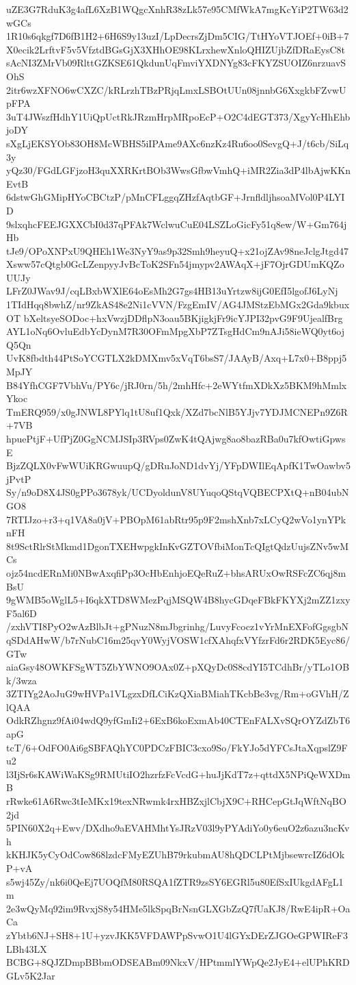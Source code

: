 uZE3G7RduK3g4afL6XzB1WQgcXnhR38zLk57e95CMfWkA7mgKcYiP2TW63d2wGCs
1R10s6qkgf7D6fB1H2+6H6S9y13uzI/LpDecrsZjDm5CIG/TtHYoVTJOEf+0iB+7
X0ecik2LrftvF5v5VfztdBGsGjX3XHhOE98KLrxhewXnloQHIZUjbZfDRaEysC8t
sAcNI3ZMrVb09RlttGZKSE61QkdunUqFmviYXDNYg83cFKYZSUOIZ6nrzuavSOhS
2itr6wzXFNO6wCXZC/kRLrzhTBzPRjqLmxLSBOtUUn08jnnbG6XxgkbFZvwUpFPA
3uT4JWszfHdhY1UiQpUctRkJRzmHrpMRpoEcP+O2C4dEGT373/XgyYcHhEhbjoDY
sXgLjEKSYOb83OH8McWBHS5iIPAme9AXc6nzKz4Ru6oo0SevgQ+J/t6cb/SiLq3y
yQz30/FGdLGFjzoH3quXXRKrtBOb3WwsGfbwVmhQ+iMR2Zia3dP4lbAjwKKnEvtB
6dstwGhGMipHYoCBCtzP/pMnCFLggqZHzfAqtbGF+JrnfldljhsoaMVol0P4LYID
9slxqhcFEEJGXXCbI0d37qPFAk7WclwuCuE04LSZLoGicFy51q8ew/W+Gm764jHb
tJe9/OPoXNPxU9QHEh1We3NyY9as9p32Smh9heyuQ+x21ojZAv98neJclgJtgd47
Xsww57cQtgb0GcLZenpyyJvBcToK2SFn54jmypv2AWAqX+jF7OjrGDUmKQZoUUJy
LFrZ0JWav9J/cqLBxbWXlE64oEsMh2G7gs4HB13uYrtzw8ijG0EfI5lgofJ6LyNj
1TIdHqq8bwhZ/nr9ZkAS48e2Ni1cVVN/FzgEmIV/AG4JMStzEbMGx2Gda9kbuxOT
bXeltsyeSODoc+hxVwzjDDflpN3oau5BKjigkjFr9icYJPI32pvG9F9UjealfBrg
AYL1oNq6OvluEdbYcDynM7R30OFmMpgXbP7ZTsgHdCm9nAJi58ieWQ0yt6ojQ5Qn
UvK8fbdth44PtSoYCGTLX2kDMXmv5xVqT6bsS7/JAAyB/Axq+L7x0+B8ppj5MpJY
B84YfhCGF7VbhVu/PY6c/jRJ0rn/5h/2mhHfc+2eWYtfmXDkXz5BKM9hMmlxYkoc
TmERQ959/x0gJNWL8PYlq1tU8uf1Qxk/XZd7bcNlB5YJjv7YDJMCNEPn9Z6R+7VB
hpuePtjF+UfPjZ0GgNCMJSIp3RVps0ZwK4tQAjwg8ao8bazRBa0u7kfOwtiGpwsE
BjzZQLX0vFwWUiKRGwuupQ/gDRuJoND1dvYj/YFpDWIlEqApfK1TwOawbv5jPvtP
Sy/n9oD8X4JS0gPPo3678yk/UCDyoldunV8UYuqoQStqVQBECPXtQ+nB04ubNGO8
7RTIJzo+r3+q1VA8a0jV+PBOpM61abRtr95p9F2mshXnb7xLCyQ2wVo1ynYPknFH
8t9SctRlrStMkmd1DgonTXEHwpgkInKvGZTOVfbiMonTcQIgtQdzUujsZNv5wMCs
ojz54ncdERnMi0NBwAxqfiPp3OcHbEnhjoEQeRuZ+bhsARUxOwRSFcZC6qj8mBsU
9gWMB5oWglL5+I6qkXTD8WMezPqjMSQW4B8hycGDqeFBkFKYXj2mZZ1zxyF5al6D
/zxhVTI8PyO2wAzBlbJt+gPNuzN8mJbgrinhg/LuvyFcocz1vYrMnEXFofGgsgbN
qSDdAHwW/b7rNubC16m25qvY0WyjVOSW1cfXAhqfxVYfzrFd6r2RDK5Eyc86/GTw
aiaGsy48OWKFSgWT5ZbYWNO9OAx0Z+pXQyDc0S8cdYI5TCdhBr/yTLo1OBk/3wza
3ZTIYg2AoJuG9wHVPa1VLgzxDfLCiKzQXiaBMiahTKcbBe3vg/Rm+oGVhH/ZlQAA
OdkRZhgnz9fAi04wdQ9yfGmIi2+6ExB6koExmAb40CTEnFALXvSQrOYZdZbT6apG
tcT/6+OdFO0Ai6gSBFAQhYC0PDCzFBIC3cxo9So/FkYJo5dYFCsJtaXqpslZ9Fu2
l3IjSr6sKAWiWaKSg9RMUtiIO2hzrfzFcVcdG+huJjKdT7z+qttdX5NPiQeWXDmB
rRwke61A6Rwc3tIeMKx19texNRwmk4rxHBZxjlCbjX9C+RHCepGtJqWftNqBO2jd
5PIN60X2q+Ewv/DXdho9aEVAHMhtYsJRzV03l9yPYAdiYo0y6euO2z6azu3ncKvh
kKHJK5yCyOdCow868lzdcFMyEZUhB79rkubmAU8hQDCLPtMjbsewrcIZ6dOkP+vA
s5wj45Zy/nk6i0QeEj7UOQfM80RSQA1fZTR9zsSY6EGRl5u80EfSxIUkgdAFgL1m
2e3wQyMq92im9RvxjS8y54HMe5lkSpqBrNsnGLXGbZzQ7fUaKJ8/RwE4ipR+OaCa
zYbtb6NJ+SH8+1U+yzvJKK5VFDAWPpSvwO1U4lGYxDErZJGOeGPWIReF3LBh43LX
BCBG+8QJZDmpBBbmODSEABm09NkxV/HPtmmlYWpQe2JyE4+elUPhKRDGLv5K2Jar
